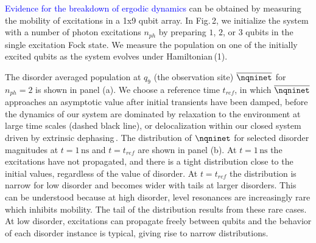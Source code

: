 \section{} %
\vspace{-16mm}

\textcolor{blue}{ Evidence for the breakdown of ergodic dynamics} can be obtained by measuring the mobility of excitations in a 1x9 qubit array. In Fig.\,2, we initialize the system with a number of photon excitations $n_{ph}$ by preparing $1$, $2$, or $3$ qubits in the single excitation Fock state. We measure the population on one of the initially excited qubits as the system evolves under Hamiltonian\,(1).

The disorder averaged population at $q_9$ (the observation site) $\overline{ \nqninet }$ for $n_{ph}=2$ is shown in panel (a). We choose a reference time $t_{ref}$, in which $\overline{ \nqninet }$ approaches an asymptotic value after initial transients have been damped, before the dynamics of our system are dominated by relaxation to the environment at large time scales (dashed black line), or delocalization within our closed system driven by extrinsic dephasing\,\cite{supplement,Znidaric2015, Levi2016, Fischer2016, Luschen2017, vanNieuwenburg2017}. The distribution of $\nqninet$ for selected disorder magnitudes at $t=1\,\text{ns}$ and $t=t_{ref}$ are shown in panel (b). At $t=1\,\text{ns}$ the excitations have not propagated, and there is a tight distribution close to the initial values, regardless of the value of disorder. At $t=t_{ref}$ the distribution is narrow for low disorder and becomes wider with tails at larger disorders. This can be understood because at high disorder, level resonances are increasingly rare which inhibits mobility. The tail of the distribution results from these rare cases. At low disorder, excitations can propagate freely between qubits and the behavior of each disorder instance is typical, giving rise to narrow distributions.

